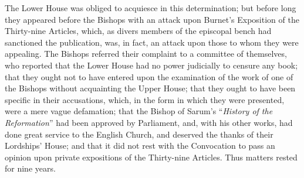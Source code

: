 The Lower House was obliged to
acquiesce in this determination; but before long they appeared before
the Bishops with an attack upon Burnet's Exposition of the Thirty-nine
Articles, which, as divers members of the episcopal bench had
sanctioned the publication, was, in fact, an attack upon those to whom
they were appealing. The Bishops referred their complaint to a
committee of themselves, who reported that the Lower House had no
power judicially to censure any book; that they ought not to have
entered upon the examination of the work of one of the Bishops without
acquainting the Upper House; that they ought to have been specific in
their accusations, which, in the form in which they were presented,
were a mere vague defamation; that the Bishop of Sarum's ``\emph{History
of the Reformation}'' had been approved by Parliament, and, with his
other works, had done great service to the English Church, and
deserved the thanks of their Lordships' House; and that it did not
rest with the Convocation to pass an opinion upon private expositions
of the Thirty-nine Articles. Thus matters rested for nine years.

